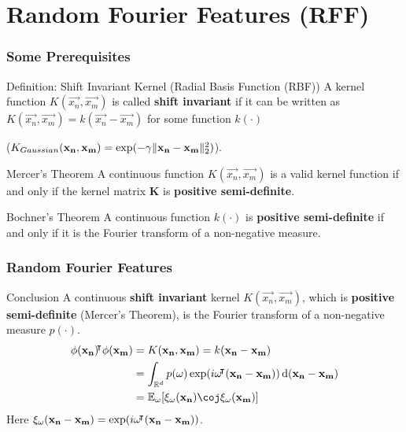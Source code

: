 \documentclass[10pt]{../formats/RU}
\begin{document}
\section{Random Fourier Features (RFF)}
\begin{frame}
\frametitle{Some Prerequisites}
\begin{alertblock}{Definition: Shift Invariant Kernel (Radial Basis Function (RBF))}
  A kernel function $K(\vec{x_n}, \vec{x_m})$ is called \textbf{shift invariant} if it can be written as $K(\vec{x_n}, \vec{x_m}) = k(\vec{x_n}-\vec{x_m})$ for some function $k(\cdot)$

  (\eg $K_{Gaussian}(\mathbf{x_n},\mathbf{x_m})=\exp(-\gamma\lVert\mathbf{x_n}-\mathbf{x_m}\rVert_2^2)$).
\end{alertblock}
\begin{block}{Mercer’s Theorem}
  A continuous function $K(\vec{x_n}, \vec{x_m})$ is a valid kernel function if and only if the kernel matrix $\mathbf{K}$ is \textbf{positive semi-definite}.
\end{block}
\begin{block}{Bochner's Theorem}
  A continuous function $k(\cdot)$ is \textbf{positive semi-definite} if and only if it is the Fourier transform of a non-negative measure.
\end{block}
\end{frame}
\begin{frame}
  \frametitle{Random Fourier Features}
  \begin{exampleblock}{Conclusion}
    A continuous \textbf{shift invariant} kernel $K(\vec{x_n}, \vec{x_m})$, which is \textbf{positive semi-definite} (Mercer's Theorem), is the Fourier transform of a non-negative measure $p(\cdot)$.
    \begin{align}
      \phi(\vec{x_n})\trn\phi(\vec{x_m})
      &= K(\vec{x_n}, \vec{x_m}) = k(\vec{x_n}-\vec{x_m}) \\
      &=\int_{\R^d}p(\vec{\omega})\exp(i\vec{\omega}\trn(\vec{x_n}-\vec{x_m}))\diff(\vec{x_n}-\vec{x_m}) \\
      &= \mathbb{E}_{\vec{\omega}}\bracks*{\xi_{\vec{\omega}}(\vec{x_n})\coj\xi_{\vec{\omega}}(\vec{x_m})}\label{rffinC}
    \end{align}
    Here
    $
    \xi_{\mathbf{\omega}}(\mathbf{x_n-x_m})=\exp(i\mathbf{\omega}{}^{\mkern-4mu\intercal}(\mathbf{x_n-x_m}))
    $.
  \end{exampleblock}
\end{frame}
\end{document}
